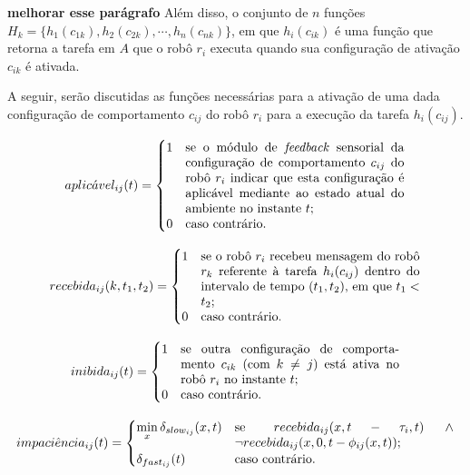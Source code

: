 \textbf{melhorar esse parágrafo} Além disso, o conjunto de $n$ funções $H_k=\{h_1(c_{1k}),\allowbreak h_2(c_{2k}), \cdots, h_n(c_{nk})\}$, em que $h_i(c_{ik})$ é uma função que retorna a tarefa em $A$ que o robô $r_i$ executa quando sua configuração de ativação $c_{ik}$ é ativada.

A seguir, serão discutidas as funções necessárias para a ativação de uma dada configuração de comportamento $c_{ij}$ do robô $r_i$ para a execução da tarefa $h_i(c_{ij})$.

\begin{equation}
    aplic\acute{a}vel_{ij}(t) =
    \begin{cases}
        1 & \parbox[t]{.5\textwidth}{se o módulo de \textit{feedback} sensorial da configuração de comportamento $c_{ij}$ do robô $r_i$ indicar que esta configuração é aplicável mediante ao estado atual do ambiente no instante $t$;} \\
        0 & \text{caso contrário.}
    \end{cases}
\end{equation}

\begin{equation}
    recebida_{ij}(k, t_1, t_2) =
    \begin{cases}
        1 & \parbox[t]{.5\textwidth}{se o robô $r_i$ recebeu mensagem do robô $r_k$ referente à tarefa $h_i(c_{ij})$ dentro do intervalo de tempo $(t_1, t_2)$, em que $t_1 < t_2$;} \\
        0 & \text{caso contrário.}
    \end{cases}
\end{equation}

\begin{equation}
    inibida_{ij}(t) =
    \begin{cases}
        1 & \parbox[t]{.5\textwidth}{se outra configuração de comportamento $c_{ik}$ (com $k \neq j$) está ativa no robô $r_i$ no instante $t$;} \\
        0 & \text{caso contrário.}
    \end{cases}
\end{equation}

\begin{equation}
    impaci\hat{e}ncia_{ij}(t) =
    \begin{cases}
        \min\limits_{x}\delta_{slow_{ij}}(x, t) & \parbox[t]{.5\textwidth}{se $ recebida_{ij}(x, t - \tau_i, t) \, \land \, \lnot recebida_{ij}(x, 0, t - \phi_{ij}(x, t))$;} \\
        \delta_{fast_{ij}}(t) & \text{caso contrário.}
    \end{cases}
\end{equation}

